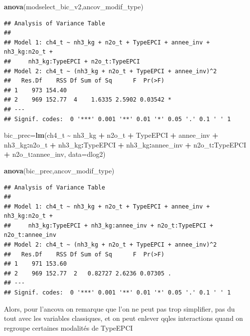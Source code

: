\documentclass[
]{article}
\newenvironment{Shaded}{\begin{snugshade}}{\end{snugshade}}
\newcommand{\AttributeTok}[1]{\textcolor[rgb]{0.13,0.29,0.53}{#1}}
\newcommand{\FunctionTok}[1]{\textcolor[rgb]{0.13,0.29,0.53}{\textbf{#1}}}
\newcommand{\NormalTok}[1]{#1}
\newcommand{\OtherTok}[1]{\textcolor[rgb]{0.56,0.35,0.01}{#1}}
\newcommand{\SpecialCharTok}[1]{\textcolor[rgb]{0.81,0.36,0.00}{\textbf{#1}}}
\begin{document}
\begin{Shaded}
\begin{Highlighting}[]
\FunctionTok{anova}\NormalTok{(modselect\_bic\_v2,ancov\_modif\_type)}
\end{Highlighting}
\end{Shaded}

\begin{verbatim}
## Analysis of Variance Table
## 
## Model 1: ch4_t ~ nh3_kg + n2o_t + TypeEPCI + annee_inv + nh3_kg:n2o_t + 
##     nh3_kg:TypeEPCI + n2o_t:TypeEPCI
## Model 2: ch4_t ~ (nh3_kg + n2o_t + TypeEPCI + annee_inv)^2
##   Res.Df    RSS Df Sum of Sq      F  Pr(>F)  
## 1    973 154.40                              
## 2    969 152.77  4    1.6335 2.5902 0.03542 *
## ---
## Signif. codes:  0 '***' 0.001 '**' 0.01 '*' 0.05 '.' 0.1 ' ' 1
\end{verbatim}

\begin{Shaded}
\begin{Highlighting}[]
\NormalTok{bic\_prec}\OtherTok{=}\FunctionTok{lm}\NormalTok{(ch4\_t }\SpecialCharTok{\textasciitilde{}}\NormalTok{ nh3\_kg }\SpecialCharTok{+}\NormalTok{ n2o\_t }\SpecialCharTok{+}\NormalTok{ TypeEPCI }\SpecialCharTok{+}\NormalTok{ annee\_inv }\SpecialCharTok{+}\NormalTok{ nh3\_kg}\SpecialCharTok{:}\NormalTok{n2o\_t }\SpecialCharTok{+} 
\NormalTok{    nh3\_kg}\SpecialCharTok{:}\NormalTok{TypeEPCI }\SpecialCharTok{+}\NormalTok{ nh3\_kg}\SpecialCharTok{:}\NormalTok{annee\_inv }\SpecialCharTok{+}\NormalTok{ n2o\_t}\SpecialCharTok{:}\NormalTok{TypeEPCI }\SpecialCharTok{+}\NormalTok{ n2o\_t}\SpecialCharTok{:}\NormalTok{annee\_inv, }\AttributeTok{data=}\NormalTok{dlog2)}

\FunctionTok{anova}\NormalTok{(bic\_prec,ancov\_modif\_type)}
\end{Highlighting}
\end{Shaded}

\begin{verbatim}
## Analysis of Variance Table
## 
## Model 1: ch4_t ~ nh3_kg + n2o_t + TypeEPCI + annee_inv + nh3_kg:n2o_t + 
##     nh3_kg:TypeEPCI + nh3_kg:annee_inv + n2o_t:TypeEPCI + n2o_t:annee_inv
## Model 2: ch4_t ~ (nh3_kg + n2o_t + TypeEPCI + annee_inv)^2
##   Res.Df    RSS Df Sum of Sq      F  Pr(>F)  
## 1    971 153.60                              
## 2    969 152.77  2   0.82727 2.6236 0.07305 .
## ---
## Signif. codes:  0 '***' 0.001 '**' 0.01 '*' 0.05 '.' 0.1 ' ' 1
\end{verbatim}

Alors, pour l'ancova on remarque que l'on ne peut pas trop simplifier,
pas du tout avec les variables classiques, et on peut enlever qqles
interactions quand on regroupe certaines modalités de TypeEPCI
\end{document}
